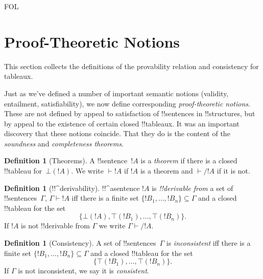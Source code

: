 \documentclass[10pt,a4paper]{article}
\theoremstyle{plain}
\theoremstyle{definition}
\newtheorem{defn}[thm]{Definition}
\theoremstyle{remark}
\newenvironment{explain}{}{}
\newenvironment{editorial}{}{}
\newcommand*{\olfileid}[3]{}
\newcommand*{\olsection}[1]{\section*{#1}}
\providecommand{\Proves}{\mathrel{\vdash}}
\providecommand{\sFmla}[2]{#1(#2)}
\providecommand{\True}{\top}
\providecommand{\False}{\bot}
\providecommand{\iftag}[1]{#1}
\providecommand{\iftag}{}
\begin{document}



\iftag{FOL}
      {\olfileid{fol}{tab}{ptn}}
      {\olfileid{pl}{tab}{ptn}}
      
\olsection{Proof-Theoretic Notions}

\begin{editorial}
This section collects the definitions of the provability relation
and consistency for tableaux.
\end{editorial}

\begin{explain}
Just as we've defined a number of important semantic notions
(validity, entailment, satisfiability), we now define corresponding
\emph{proof-theoretic notions}.  These are not defined by appeal to
satisfaction of !!{sentence}s in !!{structure}s, but by appeal to the
existence of certain closed !!{tableau}x.  It was an important
discovery that these notions coincide.  That they do is the content of
the \emph{soundness} and \emph{completeness theorems}.
\end{explain}


\begin{defn}[Theorems]
A !!{sentence}~$!A$ is a \emph{theorem} if there is a closed
!!{tableau} for~$\sFmla{\False}{!A}$.  We write $\Proves !A$ if $!A$
is a theorem and $\Proves/ !A$ if it is not.
\end{defn}

\begin{defn}[!!^{derivability}]
!!^a{sentence} $!A$ is \emph{!!{derivable} from} a set of
!!{sentence}s~$\Gamma$, $\Gamma \Proves !A$ iff there is a
finite set $\{!B_1, \dots, !B_n\} \subseteq \Gamma$
and a closed !!{tableau} for the set
\[
\{
  \sFmla{\False}{!A},
  \sFmla{\True}{!B_1}, \dots,
  \sFmla{\True}{!B_n}
  \}.
\]
If $!A$ is not !!{derivable} from $\Gamma$ we write $\Gamma \Proves/
!A$.
\end{defn}

\begin{defn}[Consistency]
A set of !!{sentence}s~$\Gamma$ is \emph{inconsistent} iff there is a
finite set $\{!B_1, \dots, !B_n\} \subseteq \Gamma$ and a closed
!!{tableau} for the set
\[
\{
  \sFmla{\True}{!B_1}, \dots,
  \sFmla{\True}{!B_n}  
  \}.
\]
If $\Gamma$ is not inconsistent, we say it is \emph{consistent}.
\end{defn}
\end{document}
